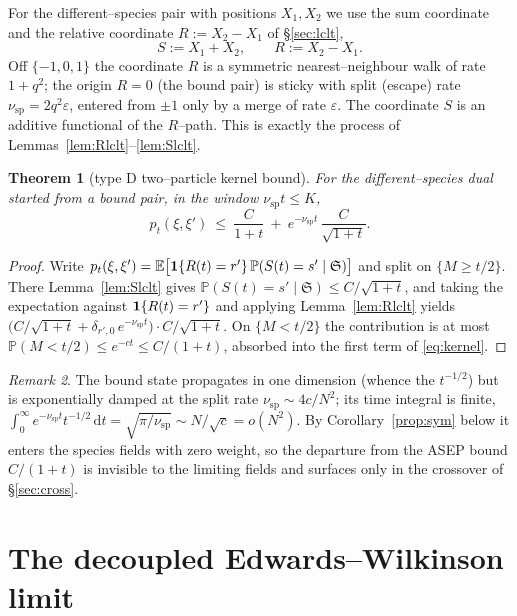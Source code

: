 \documentclass[11pt]{article}
\theoremstyle{plain}
\newtheorem{theorem}{Theorem}[section]
\theoremstyle{definition}
\theoremstyle{remark}
\newtheorem{remark}[theorem]{Remark}
\newcommand{\E}{\mathbb{E}}\newcommand{\PP}{\mathbb{P}}\newcommand{\dd}{\,\mathrm{d}}
\newcommand{\eps}{\varepsilon}\newcommand{\Exp}{\mathrm{Exp}}
\begin{document}
For the different--species pair with positions $X_1,X_2$ we use the sum coordinate and
the relative coordinate $R:=X_2-X_1$ of \S\ref{sec:lclt},
\begin{equation}\label{eq:SR}
  S:=X_1+X_2,\qquad R:=X_2-X_1.
\end{equation}
Off $\{-1,0,1\}$ the coordinate $R$ is a symmetric nearest--neighbour walk of rate
$1+q^2$; the origin $R=0$ (the bound pair) is sticky with split (escape) rate
$\nu_{\mathrm{sp}}=2q^2\eps$, entered from $\pm1$ only by a merge of rate $\eps$. The
coordinate $S$ is an additive functional of the $R$--path. This is exactly the process
of Lemmas~\ref{lem:Rlclt}--\ref{lem:Slclt}.

\begin{theorem}[type D two--particle kernel bound]\label{thm:kernel}
For the different--species dual started from a bound pair, in the window
$\nu_{\mathrm{sp}}t\le K$,
\begin{equation}\label{eq:kernel}
  p_t(\xi,\xi')\ \le\ \frac{C}{1+t}\ +\ e^{-\nu_{\mathrm{sp}}t}\,\frac{C}{\sqrt{1+t}}.
\end{equation}
\end{theorem}
\begin{proof}
Write $p_t(\xi,\xi')=\E\big[\bone\{R(t)=r'\}\,\PP(S(t)=s'\mid\mathfrak S)\big]$ and
split on $\{M\ge t/2\}$. There Lemma~\ref{lem:Slclt} gives
$\PP(S(t)=s'\mid\mathfrak S)\le C/\sqrt{1+t}$, and taking the expectation against
$\mathbf 1\{R(t)=r'\}$ and applying Lemma~\ref{lem:Rlclt} yields
$\big(C/\sqrt{1+t}+\delta_{r',0}\,e^{-\nu_{\mathrm{sp}}t}\big)\cdot C/\sqrt{1+t}$. On
$\{M<t/2\}$ the contribution is at most $\PP(M<t/2)\le e^{-ct}\le C/(1+t)$, absorbed
into the first term of \eqref{eq:kernel}.
\end{proof}

\begin{remark}\label{rem:boundstate}
The bound state propagates in one dimension (whence the $t^{-1/2}$) but is
exponentially damped at the split rate $\nu_{\mathrm{sp}}\sim4c/N^2$; its time integral
is finite, $\int_0^\infty e^{-\nu_{\mathrm{sp}}t}t^{-1/2}\dd t=\sqrt{\pi/\nu_{\mathrm{sp}}}
\sim N/\sqrt c=o(N^2)$. By Corollary~\ref{prop:sym} below it enters the species fields
with zero weight, so the departure from the ASEP bound $C/(1+t)$ is invisible to the
limiting fields and surfaces only in the crossover of \S\ref{sec:cross}.
\end{remark}

\section{The decoupled Edwards--Wilkinson limit}\label{sec:ew}
\end{document}
